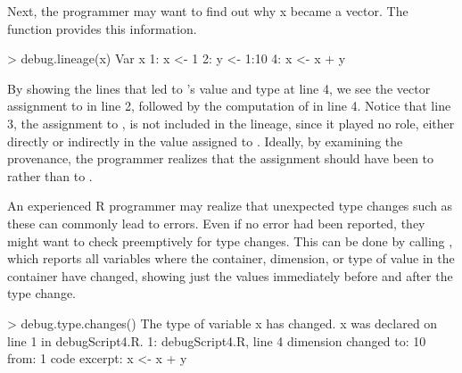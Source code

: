 %

Next, the programmer may want to find out why x became a vector.  The  function provides this information.
\begin{example}
> debug.lineage(x)
Var x 
	1: 	 x <- 1 
	2: 	 y <- 1:10 
	4: 	 x <- x + y 
\end{example}
By showing the lines that led to  's value and type at line 4, we see the vector assignment to  in line 2, followed by the computation of  in line 4. Notice that line 3, the assignment to , is not included in the lineage, since it played no role, either directly or indirectly in the value assigned to .  Ideally, by examining the provenance, the programmer realizes that the assignment should have been to  rather than to .

%

An experienced R programmer may realize that unexpected type changes such as these can commonly lead to errors.  Even if no error had been reported, they might want to check preemptively for type changes.
This can be done by calling , which reports all variables where the container, dimension, or type of value in the container have changed, showing just the values immediately before and after the type change.
\begin{example}
> debug.type.changes()
The type of variable x has changed. x was declared on line 1 in debugScript4.R.
	1: debugScript4.R, line 4
		dimension changed to: 10
		from:		      1
		code excerpt: x <- x + y 
\end{example}

%



